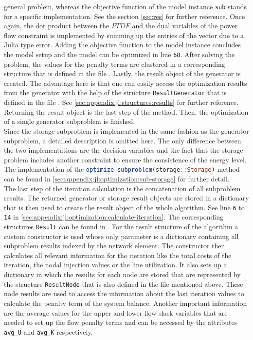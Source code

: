 general problem, whereas the objective function of the model instance \lstinline[language=julia]{sub} stands for a specific implementation. See the section \ref{sec:res} for further reference. Once again, the dot product between the $PTDF$ and the dual variables of the power flow constraint is implemented by summing up the entries of the vector due to a Julia type error. Adding the objective function to the model instance concludes the model setup and the model can be optimized in line \texttt{68}. After solving the problem, the values for the penalty terms are clustered in a corresponding structure that is defined in the file . Lastly, the result object of the generator is created. The advantage here is that one can easily access the optimization results from the generator with the help of the structure \lstinline[language=julia]{ResultGenerator} that is defined in the file . See \ref{sec:appendix:jl:structures:results} for further reference. Returning the result object is the last step of the method. Then, the optimization of a single generator subproblem is finished.\\

Since the storage subproblem is implemented in the same fashion as the generator subproblem, a detailed description is omitted here. The only difference between the two implementations are the decision variables and the fact that the storage problem includes another constraint to ensure the consistence of the energy level. The implementation of the \lstinline[language=julia]{optimize_subproblem(storage::Storage)} method can be found in \ref{sec:appendix:jl:optimization:sub-storage} for further detail.\\

The last step of the iteration calculation is the concatenation of all subproblem results. The returned generator or storage result objects are stored in a dictionary that is then used to create the result object of the whole algorithm. See line \texttt{6} to \texttt{14} in \ref{sec:appendix:jl:optimization:calculate-iteration}. The corresponding structures \lstinline[language=julia]{Result} can be found in . For the result structure of the algorithm a custom constructor is used whose only parameter is a dictionary containing all subproblem results indexed by the network element. The constructor then calculates all relevant information for the iteration like the total costs of the iteration, the nodal injection values or the line utilization. It also sets up a dictionary in which the results for each node are stored that are represented by the structure \lstinline[language=julia]{ResultNode} that is also defined in the file mentioned above. These node results are used to access the information about the last iteration values to calculate the penalty term of the system balance. Another important information are the average values for the upper and lower flow slack variables that are needed to set up the flow penalty terms and can be accessed by the attributes \lstinline[language=julia]{avg_U} and \lstinline[language=julia]{avg_K} respectively.

